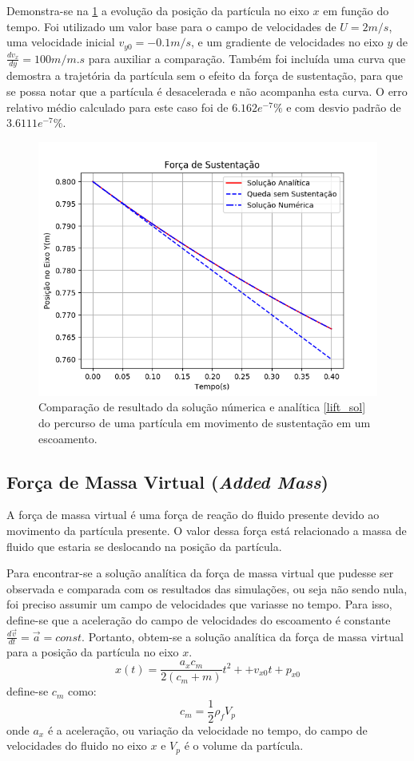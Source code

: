 Demonstra-se na \ref{lift_comp} a evolução da posição da partícula no eixo $x$ em função do tempo.
Foi utilizado um valor base para o campo de velocidades de $U=2m/s$, uma velocidade inicial $v_{y0}=-0.1m/s$, e um gradiente de velocidades no eixo $y$ de $\tfrac{dv_x}{dy}=100m/m.s$ para auxiliar a comparação.
Também foi incluída uma curva que demostra a trajetória da partícula sem o efeito da força de sustentação, para que se possa notar que a partícula é desacelerada e não acompanha esta curva.
O erro relativo médio calculado para este caso foi de $6.162e^{-7}\%$ e com desvio padrão de $3.6111e^{-7}\%$.
\begin{figure}[H]
    \centering
    \includegraphics[width=.7\linewidth]{figures/Forces_lift_validation.png}
    \caption{Comparação de resultado da solução númerica e analítica \ref{lift_sol} do percurso de uma partícula em movimento de sustentação em um escoamento.}
    \label{lift_comp}
\end{figure}

\subsection{\textbf{Força de Massa Virtual (\textit{Added Mass})}}
\label{sec_mass}
A força de massa virtual é uma força de reação do fluido presente devido ao movimento da partícula presente.
O valor dessa força está relacionado a massa de fluido que estaria se deslocando na posição da partícula.

Para encontrar-se a solução analítica da força de massa virtual que pudesse ser observada e comparada com os resultados das simulações, ou seja não sendo nula, foi preciso assumir um campo de velocidades que variasse no tempo.
Para isso, define-se que a aceleração do campo de velocidades do escoamento é constante $\tfrac{d\vec{v}}{dt}=\vec{a}=const$.
Portanto, obtem-se a solução analítica da força de massa virtual para a posição da partícula no eixo $x$.
\begin{equation}
    x(t) = \dfrac{a_x c_m}{2(c_m + m)}t^2 + + v_{x0}t + p_{x0}
    \label{mass_sol} 
\end{equation}
define-se $c_m$ como:
\begin{equation}
    c_m = \dfrac{1}{2} \rho_f V_p
    \label{mass_c} 
\end{equation}
onde $a_x$ é a aceleração, ou variação da velocidade no tempo, do campo de velocidades do fluido no eixo $x$ e $V_p$ é o volume da partícula.

